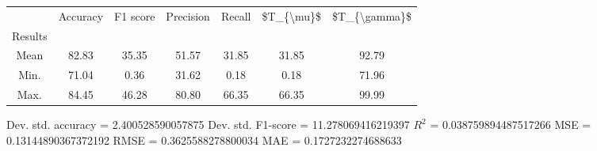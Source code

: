 \begin{tabular}{|c|c|c|c|c|c|c|}
\toprule
{} &  Accuracy &  F1 score &  Precision &  Recall &  \$T\_\{\textbackslash mu\}\$ &  \$T\_\{\textbackslash gamma\}\$ \\
Results &           &           &            &         &            &               \\
\hline
Mean    &     82.83 &     35.35 &      51.57 &   31.85 &      31.85 &         92.79 \\
Min.    &     71.04 &      0.36 &      31.62 &    0.18 &       0.18 &         71.96 \\
Max.    &     84.45 &     46.28 &      80.80 &   66.35 &      66.35 &         99.99 \\
\bottomrule
\end{tabular}

 Dev. std. accuracy = 2.400528590057875
 Dev. std. F1-score = 11.278069416219397
 $R^2$ = 0.038759894487517266
 MSE = 0.13144890367372192
 RMSE = 0.3625588278800034
 MAE = 0.1727232274688633